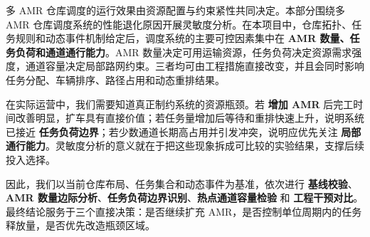 多 AMR 仓库调度的运行效果由资源配置与约束紧性共同决定。本部分围绕多 AMR 仓库调度系统的性能退化原因开展灵敏度分析。在本项目中，仓库拓扑、任务规则和动态事件机制给定后，调度系统的主要可控因素集中在 \textbf{AMR 数量、任务负荷和通道通行能力}。AMR 数量决定可用运输资源，任务负荷决定资源需求强度，通道容量决定局部路网约束。三者均可由工程措施直接改变，并且会同时影响任务分配、车辆排序、路径占用和动态重排结果。

在实际运营中，我们需要知道真正制约系统的资源瓶颈。若 \textbf{增加 AMR} 后完工时间改善明显，扩车具有直接价值；若任务量增加后等待和重排快速上升，说明系统已接近 \textbf{任务负荷边界}；若少数通道长期高占用并引发冲突，说明应优先关注 \textbf{局部通行能力}。灵敏度分析的意义就在于把这些现象拆成可比较的实验结果，支撑后续投入选择。

因此，我们以当前仓库布局、任务集合和动态事件为基准，依次进行 \textbf{基线校验}、\textbf{AMR 数量边际分析}、\textbf{任务负荷边界识别}、\textbf{热点通道容量检验} 和 \textbf{工程干预对比}。最终结论服务于三个直接决策：是否继续扩充 AMR，是否控制单位周期内的任务释放量，是否优先改造瓶颈区域。
